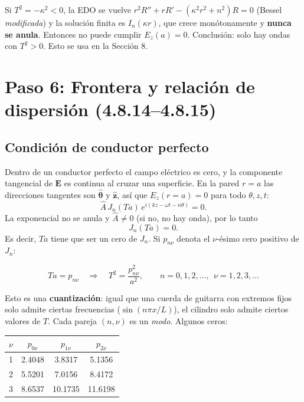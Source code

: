 \documentclass[11pt,a4paper]{article}
\newcommand{\E}{\mathbf{E}}
\newcommand{\tth}{\hat{\boldsymbol{\theta}}}
\newcommand{\zz}{\hat{\mathbf{z}}}
\begin{document}
\begin{ojo}[Nota: ¿y si $T^2<0$?]
Si $T^2=-\kappa^2<0$, la EDO se vuelve $r^2R''+rR'-(\kappa^2r^2+n^2)R=0$ (Bessel \emph{modificada}) y la solución finita es $I_n(\kappa r)$, que crece monótonamente y \textbf{nunca se anula}. Entonces no puede cumplir $E_z(a)=0$. Conclusión: solo hay ondas con $T^2>0$. Esto se usa en la Sección 8.
\end{ojo}

\section{Paso 6: Frontera y relación de dispersión (4.8.14--4.8.15)}

\subsection{Condición de conductor perfecto}
Dentro de un conductor perfecto el campo eléctrico es cero, y la componente tangencial de $\E$ es continua al cruzar una superficie. En la pared $r=a$ las direcciones tangentes son $\tth$ y $\zz$, así que $E_z(r=a)=0$ para todo $\theta,z,t$:
\[
\hat A\,J_n(Ta)\,e^{i(kz-\omega t-n\theta)}=0 .
\]
La exponencial no se anula y $\hat A\neq0$ (si no, no hay onda), por lo tanto
\[
J_n(Ta)=0 .
\]
Es decir, $Ta$ tiene que ser un cero de $J_n$. Si $p_{n\nu}$ denota el $\nu$-ésimo cero positivo de $J_n$:
\begin{resultado}[Ecuación 4.8.14]
\[
Ta=p_{n\nu}\quad\Longrightarrow\quad T^2=\frac{p_{n\nu}^2}{a^2},\qquad n=0,1,2,\dots,\ \ \nu=1,2,3,\dots
\]
\end{resultado}
Esto es una \textbf{cuantización}: igual que una cuerda de guitarra con extremos fijos solo admite ciertas frecuencias ($\sin(n\pi x/L)$), el cilindro solo admite ciertos valores de $T$. Cada pareja $(n,\nu)$ es un \emph{modo}. Algunos ceros:

\begin{center}
\begin{tabular}{cccc}
\toprule
$\nu$ & $p_{0\nu}$ & $p_{1\nu}$ & $p_{2\nu}$\\
\midrule
1 & 2.4048 & 3.8317 & 5.1356\\
2 & 5.5201 & 7.0156 & 8.4172\\
3 & 8.6537 & 10.1735 & 11.6198\\
\bottomrule
\end{tabular}
\end{center}
\end{document}
